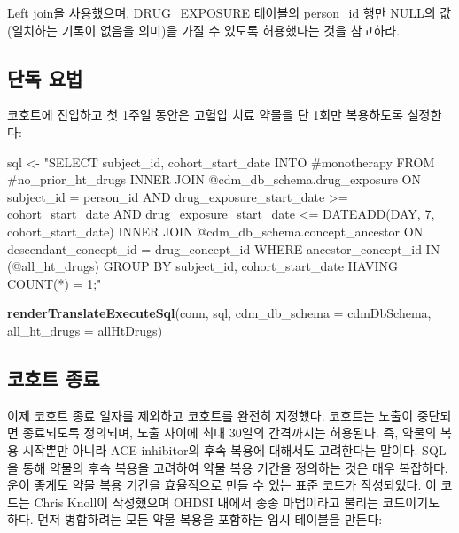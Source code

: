 \documentclass[11pt]{book}
\newenvironment{Shaded}{\begin{snugshade}}{\end{snugshade}}
\newcommand{\KeywordTok}[1]{\textcolor[rgb]{0.13,0.29,0.53}{\textbf{#1}}}
\newcommand{\DataTypeTok}[1]{\textcolor[rgb]{0.13,0.29,0.53}{#1}}
\newcommand{\StringTok}[1]{\textcolor[rgb]{0.31,0.60,0.02}{#1}}
\newcommand{\NormalTok}[1]{#1}
\theoremstyle{definition}
\theoremstyle{definition}
\theoremstyle{definition}
\theoremstyle{remark}
\begin{document}
Left join을 사용했으며, DRUG\_EXPOSURE 테이블의 person\_id 행만 NULL의
값(일치하는 기록이 없음을 의미)을 가질 수 있도록 허용했다는 것을
참고하라.

\subsection{단독 요법}\label{-}

코호트에 진입하고 첫 1주일 동안은 고혈압 치료 약물을 단 1회만 복용하도록
설정한다:

\begin{Shaded}
\begin{Highlighting}[]
\NormalTok{sql <-}\StringTok{ "SELECT subject_id,}
\StringTok{  cohort_start_date}
\StringTok{INTO #monotherapy}
\StringTok{FROM #no_prior_ht_drugs}
\StringTok{INNER JOIN @cdm_db_schema.drug_exposure}
\StringTok{  ON subject_id = person_id}
\StringTok{    AND drug_exposure_start_date >= cohort_start_date}
\StringTok{    AND drug_exposure_start_date <= DATEADD(DAY, 7, cohort_start_date)}
\StringTok{INNER JOIN @cdm_db_schema.concept_ancestor}
\StringTok{  ON descendant_concept_id = drug_concept_id}
\StringTok{WHERE ancestor_concept_id IN (@all_ht_drugs)}
\StringTok{GROUP BY subject_id,}
\StringTok{  cohort_start_date}
\StringTok{HAVING COUNT(*) = 1;"}

\KeywordTok{renderTranslateExecuteSql}\NormalTok{(conn,}
\NormalTok{                          sql,}
                          \DataTypeTok{cdm_db_schema =}\NormalTok{ cdmDbSchema,}
                          \DataTypeTok{all_ht_drugs =}\NormalTok{ allHtDrugs)}
\end{Highlighting}
\end{Shaded}

\subsection{코호트 종료}\label{-}

이제 코호트 종료 일자를 제외하고 코호트를 완전히 지정했다. 코호트는
노출이 중단되면 종료되도록 정의되며, 노출 사이에 최대 30일의 간격까지는
허용된다. 즉, 약물의 복용 시작뿐만 아니라 ACE inhibitor의 후속 복용에
대해서도 고려한다는 말이다. SQL을 통해 약물의 후속 복용을 고려하여 약물
복용 기간을 정의하는 것은 매우 복잡하다. 운이 좋게도 약물 복용 기간을
효율적으로 만들 수 있는 표준 코드가 작성되었다. 이 코드는 Chris Knoll이
작성했으며 OHDSI 내에서 종종 마법이라고 불리는 코드이기도 하다. 먼저
병합하려는 모든 약물 복용을 포함하는 임시 테이블을 만든다:
\end{document}

